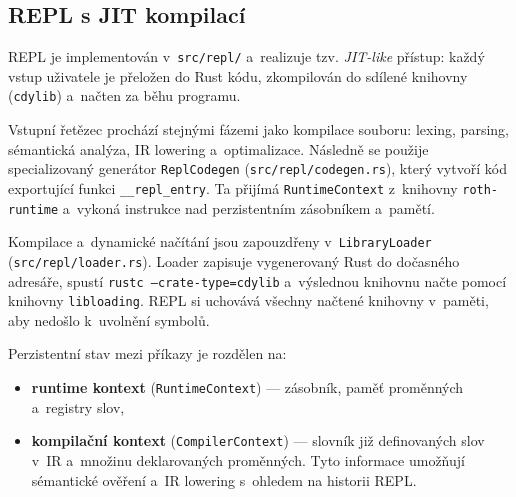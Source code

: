 \subsection{REPL s JIT kompilací}
\label{sec:repl}

REPL je implementován v~\texttt{src/repl/} a~realizuje tzv. \emph{JIT-like}
přístup: každý vstup uživatele je přeložen do Rust kódu, zkompilován do
sdílené knihovny (\texttt{cdylib}) a~načten za běhu programu.

Vstupní řetězec prochází stejnými fázemi jako kompilace souboru:
lexing, parsing, sémantická analýza, IR lowering a~optimalizace. Následně se
použije specializovaný generátor \texttt{ReplCodegen} (\texttt{src/repl/codegen.rs}),
který vytvoří kód exportující funkci \texttt{\_\_repl\_entry}. Ta přijímá
\texttt{RuntimeContext} z~knihovny \texttt{roth-runtime} a~vykoná instrukce nad
perzistentním zásobníkem a~pamětí.

Kompilace a~dynamické načítání jsou zapouzdřeny v~\texttt{LibraryLoader}
(\texttt{src/repl/loader.rs}). Loader zapisuje vygenerovaný Rust do dočasného
adresáře, spustí \texttt{rustc --crate-type=cdylib} a~výslednou knihovnu načte
pomocí knihovny \texttt{libloading}. REPL si uchovává všechny načtené knihovny
v~paměti, aby nedošlo k~uvolnění symbolů.

Perzistentní stav mezi příkazy je rozdělen na:
\begin{itemize}
	\item \textbf{runtime kontext} (\texttt{RuntimeContext}) --- zásobník,
	      paměť proměnných a~registry slov,
	\item \textbf{kompilační kontext} (\texttt{CompilerContext}) --- slovník již
	      definovaných slov v~IR a~množinu deklarovaných proměnných. Tyto
	      informace umožňují sémantické ověření a~IR lowering s~ohledem na
	      historii REPL.
\end{itemize}
